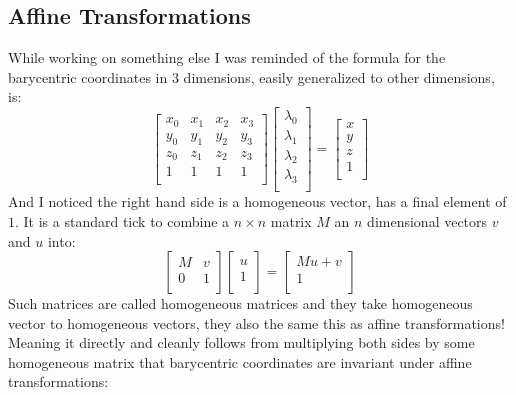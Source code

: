 \subsection{Affine Transformations}
While working on something else I was reminded of the formula for the barycentric coordinates in $3$ dimensions,
easily generalized to other dimensions,
is:
\[
\begin{bmatrix}
	x_0&x_1&x_2&x_3\\
	y_0&y_1&y_2&y_3\\
	z_0&z_1&z_2&z_3\\
	1&1&1&1\\
\end{bmatrix}
\begin{bmatrix}
	\lambda_0\\\lambda_1\\\lambda_2\\\lambda_3\\
\end{bmatrix}
=
\begin{bmatrix}
	x\\y\\z\\1\\
\end{bmatrix}
\]
And I noticed the right hand side is a homogeneous vector,
has a final element of $1$.
It is a standard tick to combine a $n\times n$ matrix $M$ an $n$ dimensional vectors $v$ and $u$ into:
\[\begin{bmatrix}
	M&v\\
	0&1\\
\end{bmatrix}
\begin{bmatrix}
	u\\1\\
\end{bmatrix}
=
\begin{bmatrix}
	Mu+v\\1\\
\end{bmatrix}
\]
Such matrices are called homogeneous matrices and they take homogeneous vector to homogeneous vectors,
they also the same this as affine transformations!
Meaning it directly and cleanly follows from multiplying both sides by some homogeneous matrix that barycentric coordinates are invariant under affine transformations:
